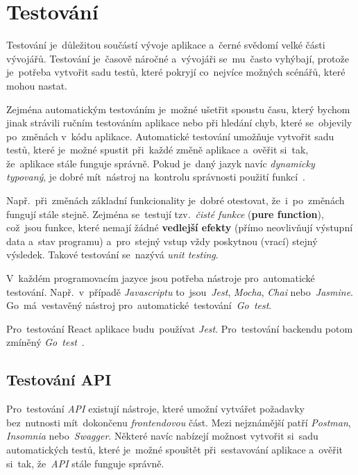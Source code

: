 \documentclass[11pt,a4paper]{report}
\begin{document}
        \section{Testování}
            Testování je~důležitou součástí vývoje aplikace a~černé svědomí velké části vývojářů. Testování je~časově náročné a~vývojáři se~mu~často vyhýbají, protože je~potřeba vytvořit sadu testů, které pokryjí co~nejvíce možných scénářů, které mohou nastat.
            
            Zejména automatickým testováním je~možné ušetřit spoustu času, který bychom jinak strávili ručním testováním aplikace nebo při hledání chyb, které se~objevily po~změnách v~kódu aplikace. Automatické testování umožňuje vytvořit sadu testů, které je~možné spustit při~každé změně aplikace a~ověřit si~tak, že~aplikace stále funguje správně. Pokud je~daný jazyk navíc \emph{dynamicky typovaný}, je dobré mít~nástroj na~kontrolu správnosti použití funkcí~\cite{compilers, itnetworkBestPractices}.
            
            Např.~při~změnách základní funkcionality je~dobré otestovat, že~i~po~změnách fungují stále stejně. Zejména se~testují tzv.~\emph{čisté funkce} (\textbf{pure function}), což~jsou funkce, které nemají žádné \textbf{vedlejší efekty} (přímo neovlivňují výstupní data a~stav programu) a~pro~stejný vstup vždy poskytnou (vrací) stejný výsledek. Takové testování se~nazývá \emph{unit testing}.
            
            V~každém programovacím jazyce jsou potřeba nástroje pro~automatické testování. Např.~v~případě \emph{Javascriptu} to~jsou~\emph{Jest}, \emph{Mocha}, \emph{Chai} nebo~\emph{Jasmine}. Go~má~vestavěný nástroj pro~automatické~testování~\emph{Go~test}.
            
            Pro~testování React aplikace budu~používat \emph{Jest}. Pro~testování backendu potom zmíněný \emph{Go~test}~\cite{jestjsTestingReact}.
            
            \subsection{Testování API}
                Pro~testování \emph{API} existují nástroje, které umožní vytvářet požadavky bez~nutnosti mít~dokončenu \emph{frontendovou} část. Mezi nejznámější patří \emph{Postman}, \emph{Insomnia} nebo~\emph{Swagger}. Některé navíc nabízejí možnost vytvořit si~sadu automatických testů, které je~možné spouštět při~sestavování aplikace a~ověřit si~tak, že~\emph{API} stále funguje správně.
\end{document}
